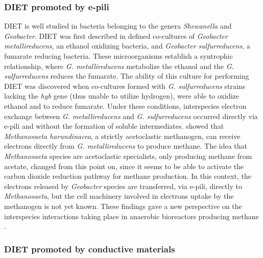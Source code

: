\documentclass[fontsize=12pt,headsepline=true, bibliography=totocnumbered, twoside]{scrbook} %
\begin{document}
 
  \subsubsection[DIET promoted by e-pili]{\ac{DIET} promoted by \ac{e-pili}}
  
  
   \acf{DIET} is well studied
   in bacteria belonging to the genera \textit{Shewanella} and \textit{Geobacter}. \ac{DIET} was first
    described in defined co-cultures of \textit{Geobacter metallireducens}, an ethanol oxidizing bacteria,
     and \textit{Geobacter sulfurreducens}, a fumarate reducing bacteria. These microorganisms establish
      a syntrophic relationship, where \textit{G. metallireducens} metabolize the ethanol and the 
      \textit{G. sulfurreducens} reduces the fumarate. The ability of this culture for performing 
      \ac{DIET} was discovered when co-cultures formed with \textit{G. sulfurreducens} strains lacking the
       \textit{hyb} gene (thus unable to utilize hydrogen), were able to oxidize ethanol and to reduce fumarate.
        Under these conditions, interspecies electron exchange between \textit{G. metallireducens} and \textit{G. sulfurreducens }
        occurred directly via \ac{e-pili} and without the formation of soluble intermediates. \citet{rotaru2014new} showed that 
         \textit{Methanosaeta harundinacea}, a strictly acetoclastic methanogen, can receive electrons directly
          from \textit{G. metallireducens} to produce methane. The idea that \textit{Methanosaeta} species are acetoclastic 
          specialists, only producing methane from acetate, changed from this point on, since it seems to be 
          able to activate the carbon dioxide reduction pathway for methane production. In this context, the electrons 
          released by \textit{Geobacter} species are transferred, via \ac{e-pili}, directly to \textit{Methanosaeta}, but the cell machinery
           involved in electrons uptake by the methanogen is not yet known. These findings gave a new perspective on 
           the interspecies interactions taking place in anaerobic bioreactors producing methane \citep{martins2018methane}.


\subsubsection{\ac{DIET} promoted by conductive materials}
\end{document}
